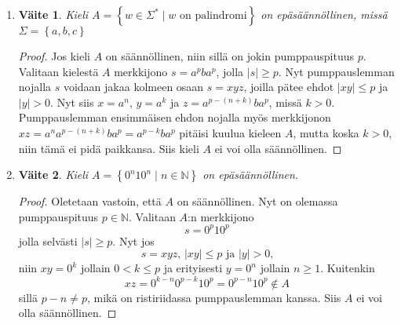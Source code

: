 \documentclass[a4paper,11pt]{article}
\newtheorem*{claim}{Väite}
\newcommand{\set}[1]{{\left\{ #1 \right\}}}
\newcommand{\Nat}{\mathbb{N}}
\begin{document}
\begin{enumerate}
\begin{enumerate}
  \item
      \begin{claim}
          Kieli $A = \set{w \in \Sigma^* \mid w \text{ on palindromi}}$ on
          epäsäännöllinen, missä $\Sigma = \set{a,b,c}$
      \end{claim}
      \begin{proof}
          Jos kieli $A$ on säännöllinen, niin sillä on jokin pumppauspituus
          $p$. Valitaan kielestä $A$ merkkijono $s = a^pba^p$, jolla $|s| \geq
          p$. Nyt pumppauslemman nojalla $s$ voidaan jakaa kolmeen osaan $s =
          xyz$, joilla pätee ehdot $|xy| \leq p$ ja $|y| > 0$. Nyt siis $x =
          a^n$, $y = a^k$ ja $z = a^{p-(n+k)}ba^p$, missä $k > 0$.
          Pumppauslemman ensimmäisen ehdon nojalla myös merkkijonon $xz =
          a^na^{p-(n+k)}ba^p = a^{p-k}ba^p$ pitäisi kuulua kieleen $A$, mutta
          koska $k > 0$, niin tämä ei pidä paikkansa. Siis kieli $A$ ei voi
          olla säännöllinen.
      \end{proof}


  \item
    \begin{claim}
      Kieli $A = \set{0^n10^n\mid n\in \Nat}$ on epäsäännöllinen.
    \end{claim}
    \begin{proof}
      Oletetaan vastoin, että $A$ on säännöllinen. Nyt on olemassa
      pumppauspituus $p \in \Nat$. Valitaan $A$:n merkkijono
      \begin{equation*}
        s = 0^p10^p
      \end{equation*}
      jolla selvästi $|s| \ge p$. Nyt jos
      \begin{equation*}
        s = xyz \text{, } |xy| \le p \text{ ja }|y| > 0 \text{,}
      \end{equation*}
      niin $xy = 0^k$ jollain $0 < k \le p$ ja erityisesti $y = 0^n$
      jollain $n \ge 1$. Kuitenkin
      \begin{equation*}
        xz = 0^{k-n}0^{p-k}10^p = 0^{p-n}10^p \notin A
      \end{equation*}
      sillä $p - n \neq p$, mikä on ristiriidassa pumppauslemman kanssa.
      Siis $A$ ei voi olla säännöllinen.
    \end{proof}
  \end{enumerate}


\end{enumerate}
\end{document}
